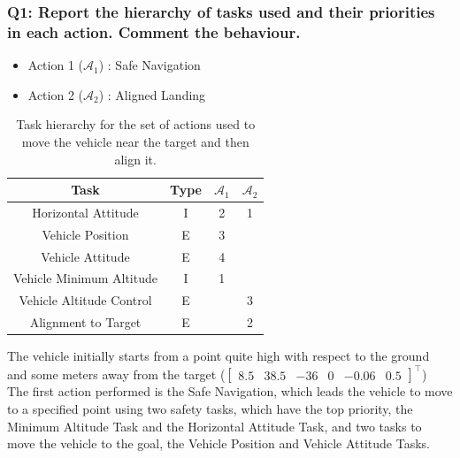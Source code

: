 \documentclass{article}
\begin{document}
\subsubsection{Q1: Report the hierarchy of tasks used and their priorities in each action. Comment the behaviour.}
\begin{table}[htb]
	\caption{Task hierarchy for the set of actions used to move the vehicle near the target and then align it.}
	\begin{itemize}
		\item Action 1 ($\mathcal{A}_{1}$) : Safe Navigation
		\item Action 2 ($\mathcal{A}_{2}$) : Aligned Landing
	\end{itemize}
	\label{tb_align2:actions_table}
	\begin{center}
		\footnotesize
		\begin{tabular}{cccc}
			\toprule
			Task & Type & $\mathcal{A}_{1}$ & $\mathcal{A}_{2}$ \\
			\midrule
			Horizontal Attitude             & I & 2 & 1 \\
			\hdashline
			Vehicle Position				& E & 3 &   \\
			\hdashline
			Vehicle Attitude                & E & 4 &   \\
			\hdashline
			Vehicle Minimum Altitude        & I & 1 &   \\
			\hdashline
			Vehicle Altitude Control        & E &   & 3 \\
			\hdashline
			Alignment to Target             & E &   & 2 \\
			
			\bottomrule
		\end{tabular}
	\end{center}
\end{table}
The vehicle initially starts from a point quite high with respect to the ground and some meters away from the target ({\small\(\begin{bmatrix} 8.5 & 38.5 & -36 & 0 & -0.06 & 0.5 \end{bmatrix}^\top\)})\\
The first action performed is the Safe Navigation, which leads the vehicle to move to a specified point using two safety tasks, which have the top priority, the Minimum Altitude Task and the Horizontal Attitude Task, and two tasks to move the vehicle to the goal, the Vehicle Position and Vehicle Attitude Tasks.\\
\end{document}
